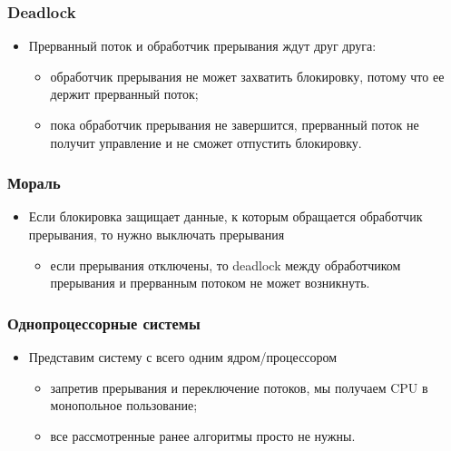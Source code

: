 \begin{frame}
\frametitle{Deadlock}
\begin{itemize}
    \item<1->Прерванный поток и обработчик прерывания ждут друг друга:
    \begin{itemize}
        \item<2->обработчик прерывания не может захватить блокировку, потому
             что ее держит прерванный поток;
        \item<3->пока обработчик прерывания не завершится, прерванный поток не
             получит управление и не сможет отпустить блокировку.
    \end{itemize}
\end{itemize}
\end{frame}

\begin{frame}
\frametitle{Мораль}
\begin{itemize}
    \item<1->Если блокировка защищает данные, к которым обращается обработчик
         прерывания, то нужно выключать прерывания
    \begin{itemize}
        \item<2->если прерывания отключены, то deadlock между обработчиком
             прерывания и прерванным потоком не может возникнуть.
    \end{itemize}
\end{itemize}
\end{frame}

\begin{frame}
\frametitle{Однопроцессорные системы}
\begin{itemize}
    \item<1->Представим систему с всего одним ядром/процессором
    \begin{itemize}
        \item<2->запретив прерывания и переключение потоков, мы получаем CPU в
             монопольное пользование;
        \item<3->все рассмотренные ранее алгоритмы просто не нужны.
    \end{itemize}
\end{itemize}
\end{frame}
